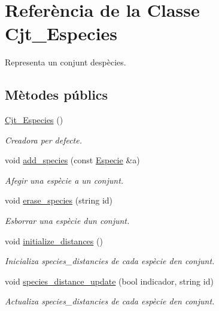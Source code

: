\hypertarget{class_cjt___especies}{}\section{Referència de la Classe Cjt\+\_\+\+Especies}
\label{class_cjt___especies}


Representa un conjunt d\textquotesingle{}espècies.  


\subsection*{Mètodes públics}
\begin{DoxyCompactItemize}
\item 
\hyperlink{class_cjt___especies_ae423b9d5a456158136c17d9210c90c2e}{Cjt\+\_\+\+Especies} ()
\begin{DoxyCompactList}\small\item\em Creadora per defecte. \end{DoxyCompactList}\item 
void \hyperlink{class_cjt___especies_ab0aafd7fe0f24410a24aec9ff934bce0}{add\+\_\+species} (const \hyperlink{class_especie}{Especie} \&a)
\begin{DoxyCompactList}\small\item\em Afegir una espècie a un conjunt. \end{DoxyCompactList}\item 
void \hyperlink{class_cjt___especies_ad72a47e0a785ac34f4908b54dd413d32}{erase\+\_\+species} (string id)
\begin{DoxyCompactList}\small\item\em Esborrar una espècie d\textquotesingle{}un conjunt. \end{DoxyCompactList}\item 
void \hyperlink{class_cjt___especies_ab041e83795b06d02ba7bad8422189361}{initialize\+\_\+distances} ()
\begin{DoxyCompactList}\small\item\em Inicializa species\+\_\+distancies de cada espècie d\textquotesingle{}en conjunt. \end{DoxyCompactList}\item 
void \hyperlink{class_cjt___especies_a043f6ce127ac78eb891f6d004eee40b0}{species\+\_\+distance\+\_\+update} (bool indicador, string id)
\begin{DoxyCompactList}\small\item\em Actualiza species\+\_\+distancies de cada espècie d\textquotesingle{}en conjunt. \end{DoxyCompactList}\item 

\end{DoxyCompactItemize}
